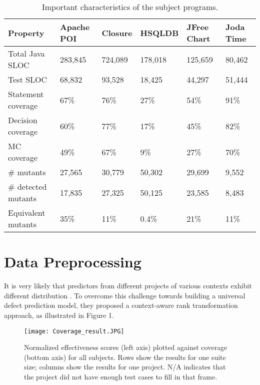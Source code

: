\begin{table}
\begin{center}
\caption{Important characteristics of the subject programs.}
 \begin{tabular}{|p{2.5cm}| p{1cm}| p{1cm}| p{1.2cm}| p{1cm}| p{1cm}|}
 \hline
 \textbf{Property} & \textbf{Apache POI} & \textbf{Closure} & \textbf{HSQLDB} & \textbf{JFree Chart} & \textbf{Joda Time}\\[0.5ex] 
 \hline
 Total Java SLOC & 283,845 & 724,089 & 178,018 & 125,659 & 80,462 \\ 

 Test SLOC & 68,832 & 93,528 & 18,425 & 44,297 & 51,444 \\
 
 Statement coverage & 67\% & 76\% & 27\% & 54\% & 91\%\\
 
 Decision coverage & 60\% & 77\% & 17\% & 45\% & 82\%\\
 
 MC coverage & 49\% & 67\% & 9\% & 27\% & 70\%\\ [1ex] 
 \hline
 \# mutants & 27,565 & 30,779 & 50,302 & 29,699 & 9,552\\
 \# detected mutants & 17,835 & 27,325 & 50,125 & 23,585 & 8,483\\
 Equivalent mutants & 35\% & 11\% & 0.4\% & 21\% & 11\%\\[1ex]
 \hline
\end{tabular}
\end{center}
\end{table}


\section{Data Preprocessing}

It is very likely that predictors from different projects of various contexts exhibit different distribution  \cite{zhang2013does}. To overcome this challenge towards building a universal defect prediction model, they proposed a context-aware rank transformation approach, as illustrated in Figure 1.

\begin{figure*}
\vspace{10pt}
\texttt{[image: Coverage\_result.JPG]}
\caption{Normalized effectiveness scores (left axis) plotted against coverage (bottom axis) for all subjects. Rows show the results for one suite size; columns show the results for one project. N/A indicates that the project did not have enough test cases to fill in that frame.}
\label{f1}
\end{figure*}



